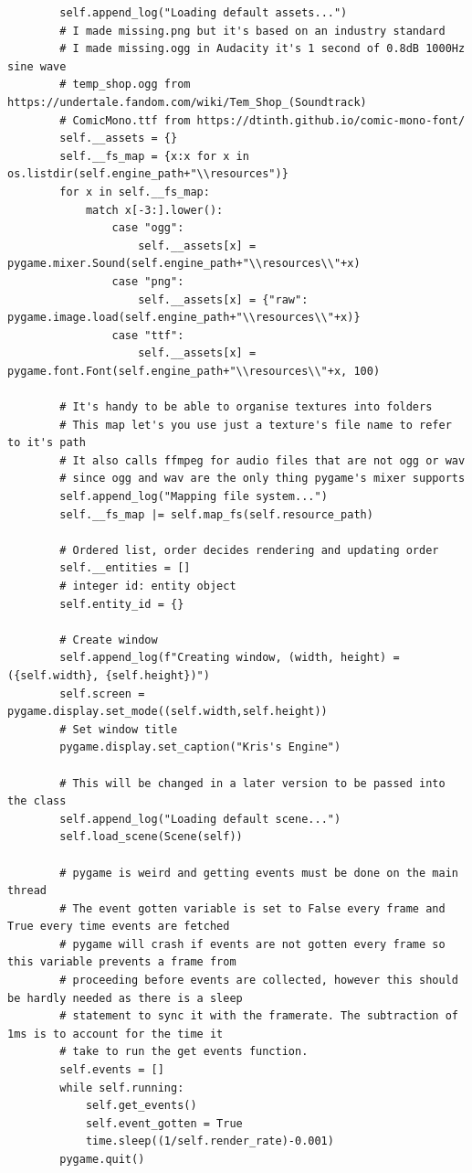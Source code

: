 \documentclass{report}
\begin{document}
\begin{verbatim}
        self.append_log("Loading default assets...")
        # I made missing.png but it's based on an industry standard
        # I made missing.ogg in Audacity it's 1 second of 0.8dB 1000Hz sine wave
        # temp_shop.ogg from https://undertale.fandom.com/wiki/Tem_Shop_(Soundtrack)
        # ComicMono.ttf from https://dtinth.github.io/comic-mono-font/
        self.__assets = {}
        self.__fs_map = {x:x for x in os.listdir(self.engine_path+"\\resources")}
        for x in self.__fs_map:
            match x[-3:].lower():
                case "ogg":
                    self.__assets[x] = pygame.mixer.Sound(self.engine_path+"\\resources\\"+x)
                case "png":
                    self.__assets[x] = {"raw": pygame.image.load(self.engine_path+"\\resources\\"+x)}
                case "ttf":
                    self.__assets[x] = pygame.font.Font(self.engine_path+"\\resources\\"+x, 100)

        # It's handy to be able to organise textures into folders
        # This map let's you use just a texture's file name to refer to it's path
        # It also calls ffmpeg for audio files that are not ogg or wav
        # since ogg and wav are the only thing pygame's mixer supports
        self.append_log("Mapping file system...")
        self.__fs_map |= self.map_fs(self.resource_path)
        
        # Ordered list, order decides rendering and updating order
        self.__entities = []
        # integer id: entity object
        self.entity_id = {}
        
        # Create window
        self.append_log(f"Creating window, (width, height) = ({self.width}, {self.height})")
        self.screen = pygame.display.set_mode((self.width,self.height))
        # Set window title
        pygame.display.set_caption("Kris's Engine")

        # This will be changed in a later version to be passed into the class
        self.append_log("Loading default scene...")
        self.load_scene(Scene(self))

        # pygame is weird and getting events must be done on the main thread
        # The event gotten variable is set to False every frame and True every time events are fetched
        # pygame will crash if events are not gotten every frame so this variable prevents a frame from 
        # proceeding before events are collected, however this should be hardly needed as there is a sleep
        # statement to sync it with the framerate. The subtraction of 1ms is to account for the time it 
        # take to run the get events function.
        self.events = []
        while self.running:
            self.get_events()
            self.event_gotten = True
            time.sleep((1/self.render_rate)-0.001)
        pygame.quit()


\end{verbatim}
\end{document}
